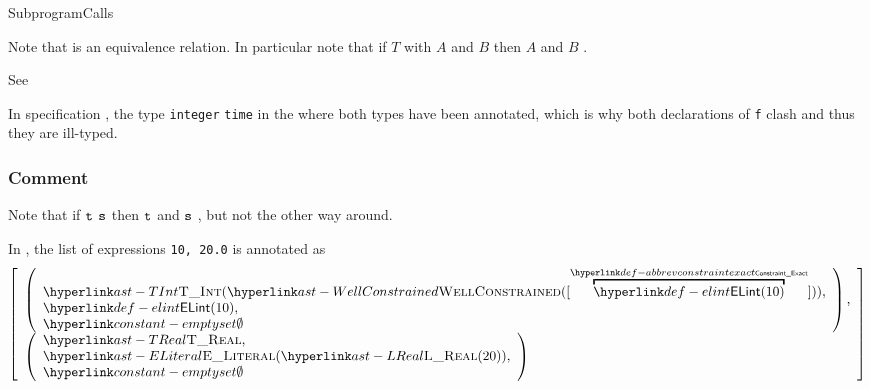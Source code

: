 \begin{TypingRuleList}{SubprogramCalls}



Note that \Prosetypeclashing{} is an equivalence relation.
In particular note that if $T$ \Prosetypeclashes{} with $A$ and $B$ then $A$ and
$B$ \Prosetypeclash{}.

See 

In specification , the type \verb|integer| \emph{\Prosetypeclashes} \verb|time|
in the \staticenvironmentterm{} where both types have been annotated,
which is why both declarations of \verb|f| clash and thus they are ill-typed.



\subsubsection{Comment}
Note that if $\texttt{t}$ \subtypesatisfiesterm{} $\texttt{s}$ then $\texttt{t}$ and $\texttt{s}$ \Prosetypeclash, but not the other
way around.


In , the list of expressions \verb|10, 20.0|
is annotated as
\[
\left[
\begin{array}{l}
\left(\begin{array}{l}\TInt(\WellConstrained([\AbbrevConstraintExact{\ELInt{10}}])),\\ \ELInt{10},\\ \emptyset\end{array}\right),\\
\left(\begin{array}{l}\TReal,\\ \eliteral{\LReal(20)},\\ \emptyset\end{array}\right)
\end{array}
\right]
\]



\end{TypingRuleList}

